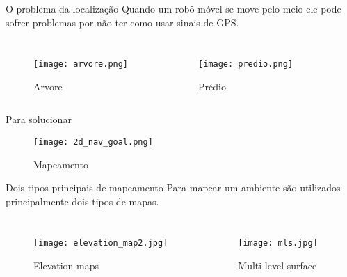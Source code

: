 \begin{frame}[t]{O problema da localização} 
    \transdissolve[duration=0.5]
    Quando um robô móvel se move pelo meio ele pode sofrer problemas por não ter como usar sinais de GPS.
        \begin{columns}[t]
            \begin{figure}
                \texttt{[image: arvore.png]}
                \caption{Arvore \cite{arvore:online}}
            \end{figure}
            \begin{figure}
                \texttt{[image: predio.png]}
                \caption{Prédio \cite{predio}}
            \end{figure}

        \end{columns}
\end{frame}

\begin{frame}[t]{Para solucionar} 
    \transdissolve[duration=0.5]
    \begin{center}
        \begin{figure}
            \texttt{[image: 2d\_nav\_goal.png]}
            \caption{Mapeamento \cite{Turtlebot}}
        \end{figure}
    \end{center}

\end{frame}


\begin{frame}[t]{Dois tipos principais de mapeamento} 
    \transdissolve[duration=0.5]
    Para mapear um ambiente são utilizados principalmente dois tipos de mapas.
    \begin{columns}[t]
        \begin{figure}
            \texttt{[image: elevation\_map2.jpg]}
            \caption{Elevation maps \cite{article}}
        \end{figure}
        \begin{figure}
            \texttt{[image: mls.jpg]}
            \caption{Multi-level surface \cite{article}}
        \end{figure}
    \end{columns}

\end{frame}

